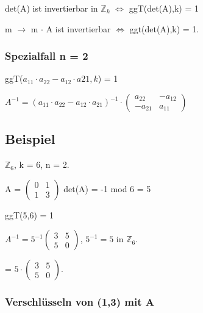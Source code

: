 det(A) ist invertierbar in $\mathbb{Z}_k$ $\Leftrightarrow$ ggT(det(A),k) = 1

\par \medskip

m $\rightarrow$ m $\cdot$ A ist invertierbar $\Leftrightarrow$ ggt(det(A),k) = 1.

\subsubsection{Spezialfall n = 2}

ggT($a_{11} \cdot a_{22} - a_{12} \cdot a{21}, k$) = 1

$A^{-1} = (a_{11} \cdot a_{22} - a_{12} \cdot a_{21})^{-1} \cdot \begin{pmatrix}a_{22} & -a_{12} \\ -a_{21} & a_{11}\end{pmatrix}$

\subsection{Beispiel}

$\mathbb{Z}_6$, k = 6, n = 2.

\par \medskip

A = $\begin{pmatrix}0 & 1 \\ 1 & 3 \end{pmatrix}$  det(A) = -1 mod 6 = 5

\par \medskip

ggT(5,6) = 1

\par \medskip

$A^{-1} = 5^{-1} \begin{pmatrix}3 & 5 \\ 5 & 0 \end{pmatrix}$, $5^{-1} = 5$ in $\mathbb{Z}_6$.

\par \medskip

= $5 \cdot \begin{pmatrix}3 & 5 \\ 5 & 0 \end{pmatrix}$.

\par \medskip

\subsubsection{Verschlüsseln von (1,3) mit A}

